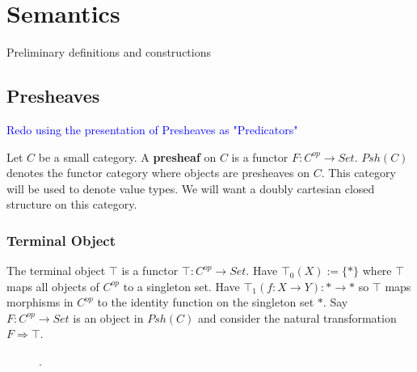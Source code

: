 \documentclass{article}
\newcommand{\blue}[1]{\textcolor{blue}{#1}}
\begin{document}
\begin{comment}
\begin{prooftree}
\AxiomC{$\Gamma \vdash^v M : A$}
\RightLabel{(where $\Gamma \equiv \Upsilon) Exchange$}
\UnaryInfC{$\Upsilon \vdash^v M : A$}
\end{prooftree}
\\
$\equiv$ is a coherence equivalece defined by 
\begin{itemize}
    \item Commutative monoid equations for $;$
    \item Commutative monoid equations for $\fatsemi$
    \item Congruence: $\Upsilon \equiv \Upsilon' \implies \Gamma(\Upsilon) \equiv \Gamma(\Upsilon')$
\end{itemize}

\end{comment}
\section{Semantics}
Preliminary definitions and constructions
\subsection{Presheaves}
\blue{Redo using the presentation of Presheaves as "Predicators"}

Let $C$ be a small category. A \textbf{presheaf} on $C$ is a functor $F : C^{op} \rightarrow Set$. $Psh(C)$ denotes the functor category where objects are presheaves on $C$. This category will be used to denote value types. We will want a doubly cartesian closed structure on this category.\\
\subsubsection{Terminal Object}
The terminal object $\top$ is a functor $\top : C^{op} \rightarrow Set$. Have $\top_{0} (X) := \{*\}$ where $\top$ maps all objects of $C^{op}$ to a singleton set. Have $\top_{1} (f : X \rightarrow Y) : {*} \rightarrow {*}$ so $\top$ maps morphisms in $C^{op}$ to the identity function on the singleton set ${*}$. 
Say $F : C^{op} \rightarrow Set$ is an object in $Psh(C)$ and consider the natural transformation $F \Rightarrow \top$.

\begin{figure}[!h]
\centering
    . 
\end{figure}
\end{document}
